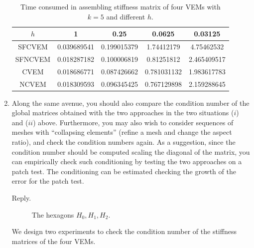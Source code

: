 \documentclass[10pt]{amsart}
\theoremstyle{definition}
\theoremstyle{remark}
\begin{document}
\begin{enumerate}[1.]
\begin{table}[htbp]
\caption{Time consumed in assembling stiffness matrix of four VEMs with $k = 5$ and different $h$.}
\label{tab:ttime}
\centering
\begin{tabular}{c|cccc}
\hline
$h$ &    1	& 0.25 & 0.0625 & 0.03125\\
\hline
SFCVEM & 0.039689541 & 0.199015379	& 1.74412179	& 4.75462532\\
SFNCVEM & 0.018287182 & 0.100006819	& 0.81251812	& 2.465409517\\
CVEM & 0.018686771 & 0.087426662	& 0.781031132	& 1.983617783\\
NCVEM & 0.018309593 & 0.096345425	& 0.767129898	& 2.159288645\\
\hline
\end{tabular}
\end{table}

\medskip

\item \textsf{Along the same avenue, you should also compare the condition number of the global matrices obtained with the two approaches in the two situations ($i$) and ($ii$) above. Furthermore, you may also wish to consider sequences of meshes with “collapsing elements” (refine a mesh and change the aspect ratio), and check the condition numbers again. As a suggestion, since the condition number should be computed scaling the diagonal of the matrix, you can empirically check such conditioning by testing the two approaches on a patch test. The conditioning can be estimated checking the growth of the error for the patch test.}

\smallskip \noindent \textcolor[rgb]{1.00,0.00,0.00}{Reply.}
\begin{figure}[htbp]
\centering
{}
\caption{The hexagons $H_0, H_1, H_2$.}
  \label{fig:collapsehexagon} %
\end{figure} 
We design two experiments to check the condition number of the stiffness
matrices of the four VEMs. 


\end{enumerate}
\end{document}
